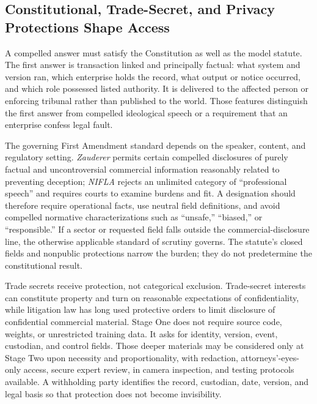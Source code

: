 \subsection{Constitutional, Trade-Secret, and Privacy Protections Shape Access}

A compelled answer must satisfy the Constitution as well as the model statute. The first answer is transaction linked and principally factual: what system and version ran, which enterprise holds the record, what output or notice occurred, and which role possessed listed authority. It is delivered to the affected person or enforcing tribunal rather than published to the world. Those features distinguish the first answer from compelled ideological speech or a requirement that an enterprise confess legal fault.

The governing First Amendment standard depends on the speaker, content, and regulatory setting. \emph{Zauderer} permits certain compelled disclosures of purely factual and uncontroversial commercial information reasonably related to preventing deception; \emph{NIFLA} rejects an unlimited category of ``professional speech'' and requires courts to examine burdens and fit. A designation should therefore require operational facts, use neutral field definitions, and avoid compelled normative characterizations such as ``unsafe,'' ``biased,'' or ``responsible.'' If a sector or requested field falls outside the commercial-disclosure line, the otherwise applicable standard of scrutiny governs. The statute's closed fields and nonpublic protections narrow the burden; they do not predetermine the constitutional result.

Trade secrets receive protection, not categorical exclusion. Trade-secret interests can constitute property and turn on reasonable expectations of confidentiality, while litigation law has long used protective orders to limit disclosure of confidential commercial material. Stage One does not require source code, weights, or unrestricted training data. It asks for identity, version, event, custodian, and control fields. Those deeper materials may be considered only at Stage Two upon necessity and proportionality, with redaction, attorneys'-eyes-only access, secure expert review, in camera inspection, and testing protocols available. A withholding party identifies the record, custodian, date, version, and legal basis so that protection does not become invisibility.

